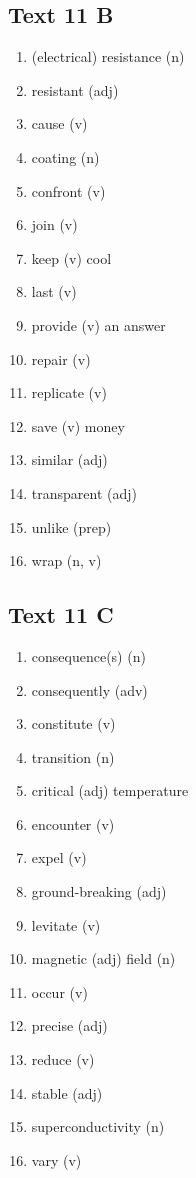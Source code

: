 \subsection*{Text 11 B}
\begin{enumerate}
      \item (electrical) resistance (n)
      \item resistant (adj)
      \item cause (v)
      \item coating (n)
      \item confront (v)
      \item join (v)
      \item keep (v) cool
      \item last (v)
      \item provide (v) an answer
      \item repair (v)
      \item replicate (v)
      \item save (v) money
      \item similar (adj)
      \item transparent (adj)
      \item unlike (prep)
      \item wrap (n, v)
\end{enumerate}

\subsection*{Text 11 C}
\begin{enumerate}
      \item consequence(s) (n)
      \item consequently (adv)
      \item constitute (v)
      \item transition (n)
      \item critical (adj) temperature
      \item encounter (v)
      \item expel (v)
      \item ground-breaking (adj)
      \item levitate (v)
      \item magnetic (adj) field (n)
      \item occur (v)
      \item precise (adj)
      \item reduce (v)
      \item stable (adj)
      \item superconductivity (n)
      \item vary (v)
\end{enumerate}

